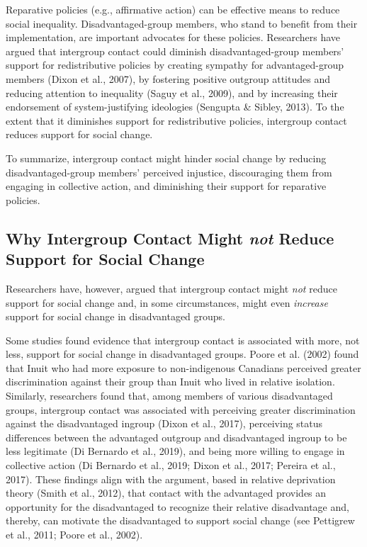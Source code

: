 \documentclass[12pt, letterpaper]{article}
\begin{document}
Reparative policies (e.g., affirmative action) can be effective means to
reduce social inequality. Disadvantaged-group members, who stand to
benefit from their implementation, are important advocates for these
policies. Researchers have argued that intergroup contact could diminish
disadvantaged-group members' support for redistributive policies by
creating sympathy for advantaged-group members (Dixon et al., 2007), by
fostering positive outgroup attitudes and reducing attention to
inequality (Saguy et al., 2009), and by increasing their endorsement of
system-justifying ideologies (Sengupta \& Sibley, 2013). To the extent
that it diminishes support for redistributive policies, intergroup
contact reduces support for social change.

To summarize, intergroup contact might hinder social change by reducing
disadvantaged-group members' perceived injustice, discouraging them from
engaging in collective action, and diminishing their support for
reparative policies.

\hypertarget{why-intergroup-contact-might-not-reduce-support-for-social-change}{%
\subsection{\texorpdfstring{Why Intergroup Contact Might \emph{not}
Reduce Support for Social
Change}{Why Intergroup Contact Might not Reduce Support for Social Change}}\label{why-intergroup-contact-might-not-reduce-support-for-social-change}}

Researchers have, however, argued that intergroup contact might
\emph{not} reduce support for social change and, in some circumstances,
might even \emph{increase} support for social change in disadvantaged
groups.

Some studies found evidence that intergroup contact is associated with
more, not less, support for social change in disadvantaged groups. Poore
et al. (2002) found that Inuit who had more exposure to non-indigenous
Canadians perceived greater discrimination against their group than
Inuit who lived in relative isolation. Similarly, researchers found
that, among members of various disadvantaged groups, intergroup contact
was associated with perceiving greater discrimination against the
disadvantaged ingroup (Dixon et al., 2017), perceiving status
differences between the advantaged outgroup and disadvantaged ingroup to
be less legitimate (Di Bernardo et al., 2019), and being more willing to
engage in collective action (Di Bernardo et al., 2019; Dixon et al.,
2017; Pereira et al., 2017). These findings align with the argument,
based in relative deprivation theory (Smith et al., 2012), that contact
with the advantaged provides an opportunity for the disadvantaged to
recognize their relative disadvantage and, thereby, can motivate the
disadvantaged to support social change (see Pettigrew et al., 2011;
Poore et al., 2002).
\end{document}
